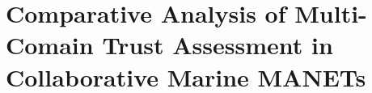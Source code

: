 

\chapter{Comparative Analysis of Multi-Comain Trust Assessment in Collaborative Marine MANETs}
\label{Chapter\thechapter}


